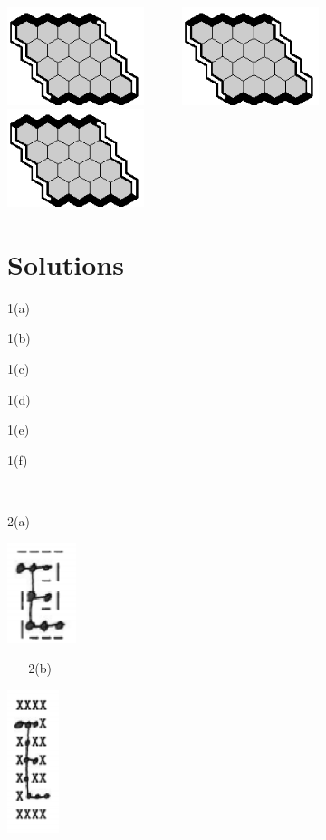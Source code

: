 \documentclass[12pt]{article}
\begin{document}
\begin{center}
\includegraphics[width=40mm]{fz/pix/4x4.eps}~~~~~~\includegraphics[width=40mm]{fz/pix/4x4.eps}~~~~~~\includegraphics[width=40mm]{fz/pix/4x4.eps}
\end{center}
\newpage
\section*{Solutions}
1(a)

\vfill

1(b)

\vfill

1(c)

\vfill

1(d)

\vfill

1(e)

\vfill

1(f)

\vfill~
\newpage
\begin{minipage}[c]{1cm}
2(a) 
\end{minipage}
\begin{minipage}[c]{3cm}
\includegraphics[width=20mm]{maze/a.eps}\
\end{minipage}
\begin{minipage}[c]{2cm}
~ ~ 2(b) 
\end{minipage}
\begin{minipage}[c]{3cm}
\includegraphics[width=15mm]{maze/b.eps}\
\end{minipage}
\end{document}

